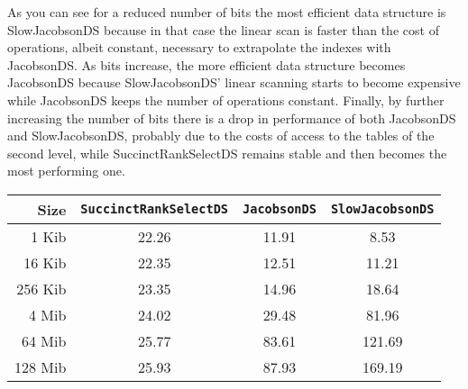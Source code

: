 \documentclass{article}
\begin{document}
\begin{center}
    \captionsetup{type=figure, width=.76\linewidth}
\end{center}

As you can see for a reduced number of bits the most efficient data structure is SlowJacobsonDS because in that case the linear scan is faster than the cost of operations, albeit constant, necessary to extrapolate the indexes with JacobsonDS. As bits increase, the more efficient data structure becomes JacobsonDS because SlowJacobsonDS' linear scanning starts to become expensive while JacobsonDS keeps the number of operations constant. Finally, by further increasing the number of bits there is a drop in performance of both JacobsonDS and SlowJacobsonDS, probably due to the costs of access to the tables of the second level, while SuccinctRankSelectDS remains stable and then becomes the most performing one.

\begin{center}
    \begin{tabular}{ r | c | c | c }
        Size & \texttt{SuccinctRankSelectDS} & \texttt{JacobsonDS} & \texttt{SlowJacobsonDS} \\ \hline
        1 Kib & 22.26 & 11.91 & 8.53 \\
        16 Kib & 22.35 & 12.51 & 11.21 \\
        256 Kib & 23.35 & 14.96 & 18.64 \\
        4 Mib & 24.02 & 29.48 & 81.96 \\
        64 Mib & 25.77 & 83.61 & 121.69 \\
        128 Mib & 25.93 & 87.93 & 169.19 \\
    \end{tabular}
     \captionsetup{type=table, width=.76\linewidth}
\end{center}
\end{document}
